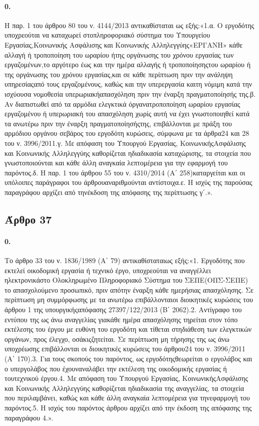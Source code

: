 \documentclass[a4paper,oneside, 10pt]{book}
\begin{document}
\paragraph { 0. } Η παρ. 1 του άρθρου 80 του ν. 4144/2013 αντικαθίσταται ως εξής:«1.α. Ο εργοδότης υποχρεούται να καταχωρεί στοπληροφοριακό σύστημα του Υπουργείου Εργασίας,Κοινωνικής Ασφάλισης και Κοινωνικής Αλληλεγγύης«ΕΡΓΑΝΗ» κάθε αλλαγή ή τροποποίηση του ωραρίου ήτης οργάνωσης του χρόνου εργασίας των εργαζομένων,το αργότερο έως και την ημέρα αλλαγής ή τροποποίησηςτου ωραρίου ή της οργάνωσης του χρόνου εργασίας,και σε κάθε περίπτωση πριν την ανάληψη υπηρεσίαςαπό τους εργαζομένους, καθώς και την υπερεργασία καιτη νόμιμη κατά την ισχύουσα νομοθεσία υπερωριακήαπασχόληση πριν την έναρξη πραγματοποίησής της.β. Αν διαπιστωθεί από τα αρμόδια ελεγκτικά όργανατροποποίηση ωραρίου εργασίας εργαζομένου ή υπερωριακή του απασχόληση χωρίς αυτή να έχει γνωστοποιηθεί κατά τα ανωτέρω πριν την έναρξη πραγματοποίησήςτης, επιβάλλονται με πράξη του αρμόδιου οργάνου σεβάρος του εργοδότη κυρώσεις, σύμφωνα με τα άρθρα24 και 28 του ν. 3996/2011.γ. Με απόφαση του Υπουργού Εργασίας, ΚοινωνικήςΑσφάλισης και Κοινωνικής Αλληλεγγύης καθορίζεται ηδιαδικασία καταχώρισης, τα στοιχεία που γνωστοποιούνται και κάθε άλλη αναγκαία λεπτομέρεια για την εφαρμογή του παρόντος.δ. Η παρ. 1 του άρθρου 55 του ν. 4310/2014 (Α΄ 258)καταργείται και οι υπόλοιπες παράγραφοι του άρθρουαναριθμούνται αντίστοιχα.ε. Η ισχύς της παρούσας παραγράφου αρχίζει από τηνέκδοση της απόφασης της περίπτωσης γ΄.».
\subsection*{ Άρθρο 37 }
\paragraph { 0. } Το άρθρο 33 του ν. 1836/1989 (Α΄ 79) αντικαθίσταταιως εξής:«1. Εργοδότης που εκτελεί οικοδομική εργασία ή τεχνικό έργο, υποχρεούται να αναγγέλλει ηλεκτρονικάστο Ολοκληρωμένο Πληροφοριακό Σύστημα του ΣΕΠΕ(ΟΠΣ-ΣΕΠΕ) το απασχολούμενο προσωπικό, πριν απότην έναρξη κάθε ημερήσιας απασχόλησης. Σε περίπτωση μη συμμόρφωσης με τα ανωτέρω επιβάλλονταιοι διοικητικές κυρώσεις του άρθρου 1 της υπουργικήςαπόφασης 27397/122/2013 (B΄ 2062).2. Αντίγραφο του εντύπου της ως άνω αναγγελίας γιακάθε ημέρα απασχόλησης τηρείται στον τόπο εκτέλεσης του έργου με ευθύνη του εργοδότη και τίθεται στηδιάθεση των ελεγκτικών οργάνων, προς έλεγχο, οσάκιςζητείται. Σε περίπτωση μη τήρησης της ως άνω υποχρέωσης επιβάλλονται οι διοικητικές κυρώσεις του άρθρου24 του ν. 3996/2011 (Α΄ 170).3. Για τους σκοπούς του παρόντος, ως εργοδότηςθεωρείται ο εργολάβος και ο υπεργολάβος που έχουναναλάβει την εκτέλεση της οικοδομικής εργασίας ή τουτεχνικού έργου.4. Με απόφαση του Υπουργού Εργασίας, ΚοινωνικήςΑσφάλισης και Κοινωνικής Αλληλεγγύης καθορίζεται ηδιαδικασία της αναγγελίας, τα στοιχεία που περιλαμβάνει, καθώς και κάθε άλλη αναγκαία λεπτομέρεια για τηνεφαρμογή του παρόντος.5. Η ισχύς του παρόντος άρθρου αρχίζει από την έκδοση της απόφασης της παραγράφου 4.».
\end{document}
